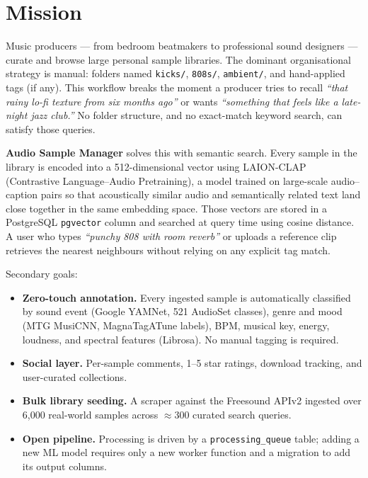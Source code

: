 \documentclass[12pt,letterpaper]{report}
\begin{document}
\chapter{Mission}

Music producers --- from bedroom beatmakers to professional sound designers --- curate and browse large personal sample libraries. The dominant organisational strategy is manual: folders named \texttt{kicks/}, \texttt{808s/}, \texttt{ambient/}, and hand-applied tags (if any). This workflow breaks the moment a producer tries to recall \textit{``that rainy lo-fi texture from six months ago''} or wants \textit{``something that feels like a late-night jazz club.''} No folder structure, and no exact-match keyword search, can satisfy those queries.

\textbf{Audio Sample Manager} solves this with semantic search. Every sample in the library is encoded into a 512-dimensional vector using LAION-CLAP (Contrastive Language--Audio Pretraining), a model trained on large-scale audio--caption pairs so that acoustically similar audio and semantically related text land close together in the same embedding space. Those vectors are stored in a PostgreSQL \texttt{pgvector} column and searched at query time using cosine distance. A user who types \textit{``punchy 808 with room reverb''} or uploads a reference clip retrieves the nearest neighbours without relying on any explicit tag match.

Secondary goals:

\begin{itemize}
  \item \textbf{Zero-touch annotation.} Every ingested sample is automatically classified by sound event (Google YAMNet, 521 AudioSet classes), genre and mood (MTG MusiCNN, MagnaTagATune labels), BPM, musical key, energy, loudness, and spectral features (Librosa). No manual tagging is required.
  \item \textbf{Social layer.} Per-sample comments, 1--5 star ratings, download tracking, and user-curated collections.
  \item \textbf{Bulk library seeding.} A scraper against the Freesound APIv2 ingested over 6{,}000 real-world samples across $\approx$300 curated search queries.
  \item \textbf{Open pipeline.} Processing is driven by a \texttt{processing\_queue} table; adding a new ML model requires only a new worker function and a migration to add its output columns.
\end{itemize}
\end{document}

